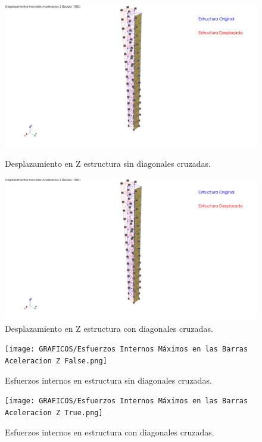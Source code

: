 \begin{figure}[H]
    \centering
    \begin{minipage}{0.45\textwidth}
        \centering
        \includegraphics[width=\textwidth]{GRAFICOS/Desplazamientos Inerciales Aceleracion Z False.png}
        \caption{Desplazamiento en Z estructura sin diagonales cruzadas.}
        \label{fig:imagen5}
    \end{minipage}
    \hfill
    \begin{minipage}{0.45\textwidth}
        \centering
        \includegraphics[width=\textwidth]{GRAFICOS/Desplazamientos Inerciales Aceleracion Z True.png}
        \caption{Desplazamiento en Z estructura con diagonales cruzadas.}
        \label{fig:imagen6}
    \end{minipage}
\end{figure}

\begin{figure}[H]
    \centering
    \begin{minipage}{0.45\textwidth}
        \centering
        \texttt{[image: GRAFICOS/Esfuerzos Internos Máximos en las Barras Aceleracion Z False.png]}
        \caption{Esfuerzos internos en estructura sin diagonales cruzadas.}
        \label{fig:imagen55}
    \end{minipage}
    \hfill
    \begin{minipage}{0.45\textwidth}
        \centering
        \texttt{[image: GRAFICOS/Esfuerzos Internos Máximos en las Barras Aceleracion Z True.png]}
        \caption{Esfuerzos internos en estructura con diagonales cruzadas.}
        \label{fig:imagen66}
    \end{minipage}
\end{figure}

